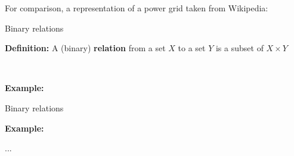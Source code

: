 \begin{frame}[fragile]{}

For comparison, a representation of a power grid taken from Wikipedia: 

\vfill \vfill \vfill \vfill \vfill \vfill \vfill \vfill \vfill 

\end{frame}



\begin{frame}[fragile]{Binary relations}

\textbf{Definition:} A (binary) \textbf{relation} from a set $X$ to a set $Y$ is a subset of $X \times Y$

\

\textbf{Example:} 

\vfill \vfill \vfill \vfill \vfill \vfill \vfill \vfill \vfill 

\end{frame}


\begin{frame}[fragile]{Binary relations}

\textbf{Example:} 

\vfill \vfill \vfill \vfill \vfill \vfill \vfill \vfill \vfill 

\end{frame}





\begin{frame}[fragile]{}


...

\end{frame}




\
